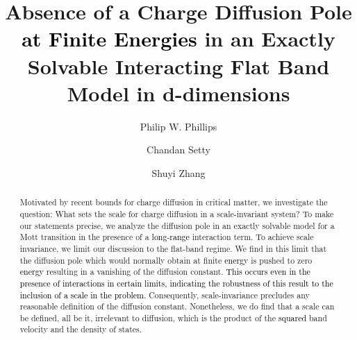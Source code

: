 \documentclass[prl,aps,twocolumn,groupaddress]{revtex4-1}
\begin{document}
\title{Absence of  a Charge Diffusion Pole \textcolor{black}{at Finite Energies} in an Exactly Solvable Interacting Flat Band Model in d-dimensions}
\author{Philip W. Phillips}
\author{Chandan Setty}
\author{Shuyi Zhang}


\begin{abstract}
Motivated by recent bounds for charge diffusion in critical matter, we investigate the question:  What sets the scale for charge diffusion in a scale-invariant system?    To make our statements precise, we analyze the diffusion pole in an exactly solvable model for a Mott transition in the presence of a \textcolor{black}{long-range} interaction term. To achieve scale invariance, we limit our discussion to the flat-band regime.  We find in this limit that the diffusion pole which would normally obtain at finite \textcolor{black}{energy} is pushed to zero \textcolor{black}{energy} resulting in a vanishing of the diffusion constant. \textcolor{black}{This occurs even in the presence of interactions in certain limits, indicating the robustness of this result to the inclusion of a scale in the problem.}  Consequently, scale-invariance precludes any reasonable definition of the diffusion constant.  Nonetheless, we do find that a scale can be defined, all be it, irrelevant to diffusion, which is the product of the \textcolor{black}{squared} band velocity and the density of states.  \end{abstract}

\maketitle
\end{document}
